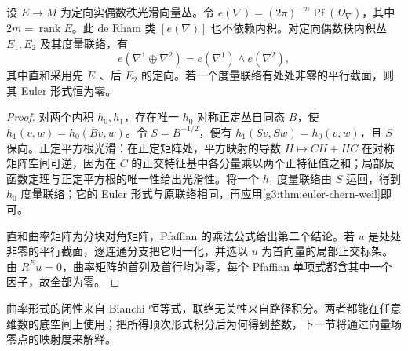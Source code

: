 \begin{proposition}\label{g3:prop:euler-form-basic-properties}
	设 \(E\to M\) 为定向实偶数秩光滑向量丛。令 \(e(\nabla)=(2\pi)^{-m}\operatorname{Pf}(\Omega_\nabla)\)，其中 \(2m=\operatorname{rank}E\)。此 de Rham 类 \([e(\nabla)]\) 也不依赖内积。对定向偶数秩内积丛 \(E_1,E_2\) 及其度量联络，有
	\[
		e(\nabla^1\oplus\nabla^2)=e(\nabla^1)\wedge e(\nabla^2),
	\]
	其中直和采用先 \(E_1\)、后 \(E_2\) 的定向。若一个度量联络有处处非零的平行截面，则其 Euler 形式恒为零。
\end{proposition}
\begin{proof}
	对两个内积 \(h_0,h_1\)，存在唯一 \(h_0\) 对称正定丛自同态 \(B\)，使 \(h_1(v,w)=h_0(Bv,w)\)。令 \(S=B^{-1/2}\)，便有 \(h_1(Sv,Sw)=h_0(v,w)\)，且 \(S\) 保向。正定平方根光滑：在正定矩阵处，平方映射的导数 \(H\mapsto CH+HC\) 在对称矩阵空间可逆，因为在 \(C\) 的正交特征基中各分量乘以两个正特征值之和；局部反函数定理与正定平方根的唯一性给出光滑性。将一个 \(h_1\) 度量联络由 \(S\) 运回，得到 \(h_0\) 度量联络；它的 Euler 形式与原联络相同，再应用\cref{g3:thm:euler-chern-weil}即可。

	直和曲率矩阵为分块对角矩阵，Pfaffian 的乘法公式给出第二个结论。若 \(u\) 是处处非零的平行截面，逐连通分支把它归一化，并选以 \(u\) 为首向量的局部正交标架。由 \(R^Eu=0\)，曲率矩阵的首列及首行均为零，每个 Pfaffian 单项式都含其中一个因子，故全部为零。
\end{proof}

曲率形式的闭性来自 Bianchi 恒等式，联络无关性来自路径积分。两者都能在任意维数的底空间上使用；把所得顶次形式积分后为何得到整数，下一节将通过向量场零点的映射度来解释。
